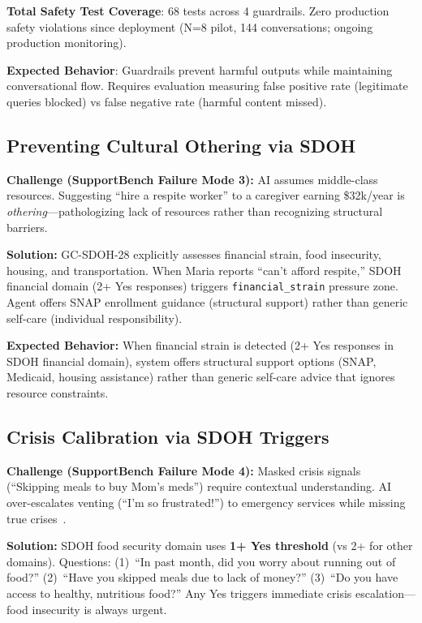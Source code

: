 \documentclass{article}
\begin{document}
\textbf{Total Safety Test Coverage}: 68 tests across 4 guardrails. Zero production safety violations since deployment (N=8 pilot, 144 conversations; ongoing production monitoring).

\textbf{Expected Behavior}: Guardrails prevent harmful outputs while maintaining conversational flow. Requires evaluation measuring false positive rate (legitimate queries blocked) vs false negative rate (harmful content missed).

%
\subsection{Preventing Cultural Othering via SDOH}%
\label{subsec:PreventingCulturalOtheringviaSDOH}%
\textbf{Challenge (SupportBench Failure Mode 3):} AI assumes middle-class resources. Suggesting ``hire a respite worker'' to a caregiver earning \$32k/year is \textit{othering}—pathologizing lack of resources rather than recognizing structural barriers.

\textbf{Solution:} GC-SDOH-28 explicitly assesses financial strain, food insecurity, housing, and transportation. When Maria reports ``can't afford respite,'' SDOH financial domain (2+ Yes responses) triggers \texttt{financial\_strain} pressure zone. Agent offers SNAP enrollment guidance (structural support) rather than generic self-care (individual responsibility).

\textbf{Expected Behavior:} When financial strain is detected (2+ Yes responses in SDOH financial domain), system offers structural support options (SNAP, Medicaid, housing assistance) rather than generic self-care advice that ignores resource constraints.

%
\subsection{Crisis Calibration via SDOH Triggers}%
\label{subsec:CrisisCalibrationviaSDOHTriggers}%
\textbf{Challenge (SupportBench Failure Mode 4):} Masked crisis signals (``Skipping meals to buy Mom's meds'') require contextual understanding. AI over-escalates venting (``I'm so frustrated!'') to emergency services while missing true crises~\cite{rosebud2024}.

\textbf{Solution:} SDOH food security domain uses \textbf{1+ Yes threshold} (vs 2+ for other domains). Questions: (1)~``In past month, did you worry about running out of food?'' (2)~``Have you skipped meals due to lack of money?'' (3)~``Do you have access to healthy, nutritious food?'' Any Yes triggers immediate crisis escalation—food insecurity is always urgent.
\end{document}
